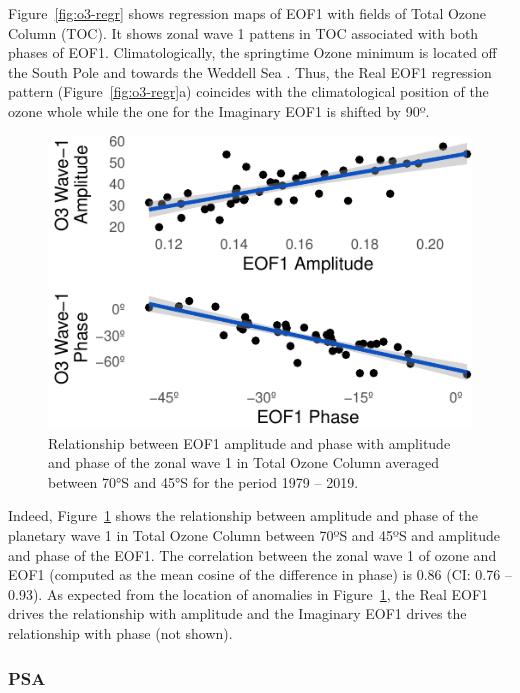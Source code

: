 \documentclass[smallextended]{svjour3}       %
\begin{document}
Figure~\ref{fig:o3-regr} shows regression maps of EOF1 with fields of Total Ozone Column (TOC). It shows zonal wave 1 pattens in TOC associated with both phases of EOF1. Climatologically, the springtime Ozone minimum is located off the South Pole and towards the Weddell Sea \citep{wirth1993}. Thus, the Real EOF1 regression pattern (Figure~\ref{fig:o3-regr}a) coincides with the climatological position of the ozone whole while the one for the Imaginary EOF1 is shifted by 90º.



\begin{figure}
\centering
\includegraphics{../figures/wave1-o3-1.pdf}
\caption{\label{fig:wave1-o3}Relationship between EOF1 amplitude and phase with amplitude and phase of the zonal wave 1 in Total Ozone Column averaged between 70°S and 45°S for the period 1979 -- 2019.}
\end{figure}

Indeed, Figure~\ref{fig:wave1-o3} shows the relationship between amplitude and phase of the planetary wave 1 in Total Ozone Column between 70ºS and 45ºS and amplitude and phase of the EOF1. The correlation between the zonal wave 1 of ozone and EOF1 (computed as the mean cosine of the difference in phase) is 0.86 (CI: 0.76 -- 0.93). As expected from the location of anomalies in Figure~\ref{fig:wave1-o3}, the Real EOF1 drives the relationship with amplitude and the Imaginary EOF1 drives the relationship with phase (not shown).

\hypertarget{psa}{%
\subsubsection{PSA}\label{psa}}
\end{document}
